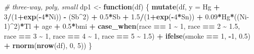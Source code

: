 \documentclass[12pt, twoside]{amherstthesis}
\newenvironment{Shaded}{\begin{snugshade}}{\end{snugshade}}
\newcommand{\AttributeTok}[1]{\textcolor[rgb]{0.13,0.29,0.53}{#1}}
\newcommand{\CommentTok}[1]{\textcolor[rgb]{0.56,0.35,0.01}{\textit{#1}}}
\newcommand{\ControlFlowTok}[1]{\textcolor[rgb]{0.13,0.29,0.53}{\textbf{#1}}}
\newcommand{\DecValTok}[1]{\textcolor[rgb]{0.00,0.00,0.81}{#1}}
\newcommand{\FloatTok}[1]{\textcolor[rgb]{0.00,0.00,0.81}{#1}}
\newcommand{\FunctionTok}[1]{\textcolor[rgb]{0.13,0.29,0.53}{\textbf{#1}}}
\newcommand{\NormalTok}[1]{#1}
\newcommand{\OtherTok}[1]{\textcolor[rgb]{0.56,0.35,0.01}{#1}}
\newcommand{\SpecialCharTok}[1]{\textcolor[rgb]{0.81,0.36,0.00}{\textbf{#1}}}
\begin{document}
\begin{Shaded}
\begin{Highlighting}[]
\CommentTok{\# three{-}way, poly, small}
\NormalTok{dp1 }\OtherTok{\textless{}{-}} \ControlFlowTok{function}\NormalTok{(df) \{}
  \FunctionTok{mutate}\NormalTok{(df, }\AttributeTok{y =} 
\NormalTok{           Hg }\SpecialCharTok{+} \DecValTok{3}\SpecialCharTok{/}\NormalTok{(}\DecValTok{1}\SpecialCharTok{+}\FunctionTok{exp}\NormalTok{(}\SpecialCharTok{{-}}\DecValTok{4}\SpecialCharTok{*}\NormalTok{Ni)) }\SpecialCharTok{{-}}\NormalTok{ (Sb}\SpecialCharTok{\^{}}\DecValTok{2}\NormalTok{) }\SpecialCharTok{+} \FloatTok{0.5}\SpecialCharTok{*}\NormalTok{Sb }\SpecialCharTok{+} \FloatTok{1.5}\SpecialCharTok{/}\NormalTok{(}\DecValTok{1}\SpecialCharTok{+}\FunctionTok{exp}\NormalTok{(}\SpecialCharTok{{-}}\DecValTok{4}\SpecialCharTok{*}\NormalTok{Sn)) }\SpecialCharTok{+} 
           \FloatTok{0.09}\SpecialCharTok{*}\NormalTok{Hg}\SpecialCharTok{*}\NormalTok{((Ni}\DecValTok{{-}1}\NormalTok{)}\SpecialCharTok{\^{}}\DecValTok{2}\NormalTok{)}\SpecialCharTok{*}\NormalTok{Tl }\SpecialCharTok{+}
\NormalTok{           age }\SpecialCharTok{+} \FloatTok{0.5}\SpecialCharTok{*}\NormalTok{bmi }\SpecialCharTok{+} 
           \FunctionTok{case\_when}\NormalTok{(race }\SpecialCharTok{==} \DecValTok{1} \SpecialCharTok{\textasciitilde{}} \DecValTok{1}\NormalTok{, }
\NormalTok{                     race }\SpecialCharTok{==} \DecValTok{2} \SpecialCharTok{\textasciitilde{}} \FloatTok{1.5}\NormalTok{, }
\NormalTok{                     race }\SpecialCharTok{==} \DecValTok{3} \SpecialCharTok{\textasciitilde{}} \DecValTok{1}\NormalTok{, }
\NormalTok{                     race }\SpecialCharTok{==} \DecValTok{4} \SpecialCharTok{\textasciitilde{}} \DecValTok{1}\NormalTok{, }
\NormalTok{                     race }\SpecialCharTok{==} \DecValTok{5} \SpecialCharTok{\textasciitilde{}} \FloatTok{1.5}\NormalTok{) }\SpecialCharTok{+}
           \FunctionTok{ifelse}\NormalTok{(smoke }\SpecialCharTok{==} \DecValTok{1}\NormalTok{, }\SpecialCharTok{{-}}\DecValTok{1}\NormalTok{, }\FloatTok{0.5}\NormalTok{) }\SpecialCharTok{+}
           \FunctionTok{rnorm}\NormalTok{(}\FunctionTok{nrow}\NormalTok{(df), }\DecValTok{0}\NormalTok{, }\DecValTok{5}\NormalTok{))}
\NormalTok{\}}


\end{Highlighting}
\end{Shaded}
\end{document}
